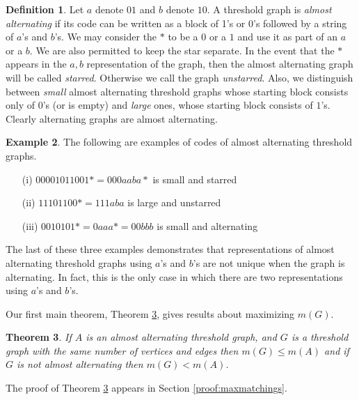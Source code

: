 \documentclass[12pt]{amsart}
\theoremstyle{plain}
\newtheorem{thm}{Theorem}[section]
\theoremstyle{definition}
\newtheorem{defi}[thm]{Definition}
\newtheorem{ex}[thm]{Example}
\begin{document}
\begin{defi}
Let $a$  denote $01$ and $b$ denote $10$.  A threshold graph is \emph{almost alternating} if its code can be written as a block of 1's or 0's followed by a string of $a$'s and $b$'s.  We may consider the $*$ to be a $0$ or a $1$ and use it as part of an $a$ or a $b$.  We are also permitted to keep the star separate.  In the event that the $*$ appears in the $a,b$ representation of the graph, then the almost alternating graph will be called \emph{starred}.  Otherwise we call the graph \emph{unstarred}.  Also, we distinguish between \emph{small} almost alternating threshold graphs whose starting block consists only of $0$'s (or is empty) and  \emph{large} ones, whose starting block consists of $1$'s. Clearly alternating graphs are almost alternating.
\end{defi}


\begin{ex}  The following are examples of codes of almost alternating threshold graphs.
\begin{enumerate}
\item[(i)]  $00001011001*=000aaba*$ is small and starred 
\item[(ii)]  $11101100*=111aba$ is  large and unstarred
\item[(iii)]  $0010101*=0aaa*=00bbb$ is small and alternating
\end{enumerate}

The last of these three examples demonstrates that representations of almost alternating threshold graphs using $a$'s and $b$'s are not unique when the graph is alternating.  In fact, this is the only case in which there are two representations using $a$'s and $b$'s.

\end{ex}

Our first main theorem, Theorem \ref{thm:MaxMatchings}, gives results about maximizing $m(G)$.

\begin{thm}\label{thm:MaxMatchings}
If $A$ is an almost alternating threshold graph, and $G$ is a threshold graph with the same number of vertices and edges then $m(G)\leq m(A)$ and if $G$ is not almost alternating then $m(G) < m(A)$.
\end{thm}

The proof of Theorem \ref{thm:MaxMatchings} appears in Section \ref{proof:maxmatchings}.  
\end{document}
